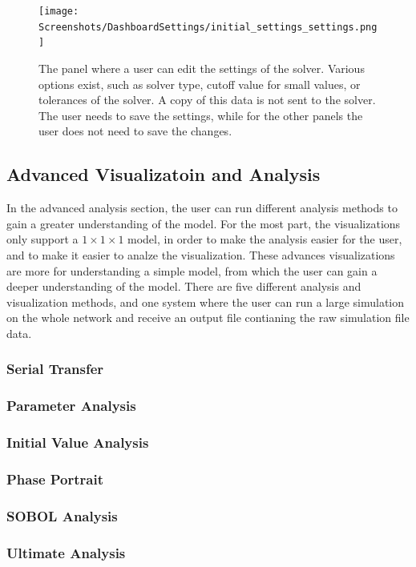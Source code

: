 \begin{figure}
    \centering
    \texttt{[image: Screenshots/DashboardSettings/initial\_settings\_settings.png]}
    \caption{
        The panel where a user can edit the settings of the solver. 
        Various options exist, such as solver type, cutoff value for small values, or tolerances of the solver. 
        A copy of this data is not sent to the solver. 
        The user needs to save the settings, while for the other panels the user does not need to save the changes. 
    }
    \label{fig:ss:ds:settings}
\end{figure}

\subsection{Advanced Visualizatoin and Analysis}
In the advanced analysis section, the user can run different analysis methods to gain a greater understanding of the model. 
For the most part, the visualizations only support a $1 \times 1\times 1$ model, in order to make the analysis easier for the user, and to make it easier to analze the visualization. 
These advances visualizations are more for understanding a simple model, from which the user can gain a deeper understanding of the model. 
There are five different analysis and visualization methods, and one system where the user can run a large simulation on the whole network and receive an output file contianing the raw simulation file data. 
\subsubsection{Serial Transfer}
\subsubsection{Parameter Analysis}
\subsubsection{Initial Value Analysis}
\subsubsection{Phase Portrait}
\subsubsection{SOBOL Analysis}
\subsubsection{Ultimate Analysis}